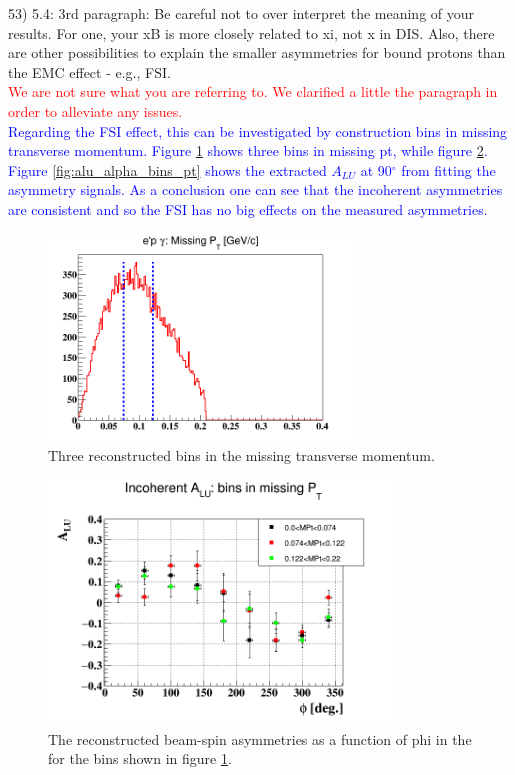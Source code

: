 53) 5.4: 3rd paragraph: Be careful not to over interpret the meaning of your 
results. For one, your xB is more closely related to xi, not x in DIS. Also, 
there are other possibilities to explain the smaller asymmetries for bound 
protons than the EMC effect - e.g., FSI. \\

\textcolor{red}{We are not sure what you are referring to. We clarified a 
little the paragraph in order to alleviate any issues.} \\

\textcolor{blue}{Regarding the FSI effect, this can be investigated by 
construction bins in missing transverse momentum. Figure 
\ref{fig:bins_pt_incoh} shows three bins in missing pt, while figure 
\ref{fig:incoh_Alu_pt}. Figure \ref{fig:alu_alpha_bins_pt} shows the extracted 
$A_{LU}$ at 90$^{\circ}$ from fitting the asymmetry signals. As a conclusion 
one can see that the incoherent asymmetries are consistent and so the FSI has 
no big effects on the measured asymmetries.  }\\
 \begin{figure}[h!]
  \centering
  \includegraphics[height=5.5cm]{fig/incoh_bins_pt.png}
  \caption{ Three reconstructed bins in the missing transverse momentum.}
  \label{fig:bins_pt_incoh}
 \end{figure}

 \begin{figure}[h!]
  \centering
  \includegraphics[height=6.5cm]{fig/BSA_incoherent_PT.png}
  \caption{The reconstructed beam-spin asymmetries as a function of phi in the 
  for the bins shown in figure \ref{fig:bins_pt_incoh}.}
  \label{fig:incoh_Alu_pt}
 \end{figure}

